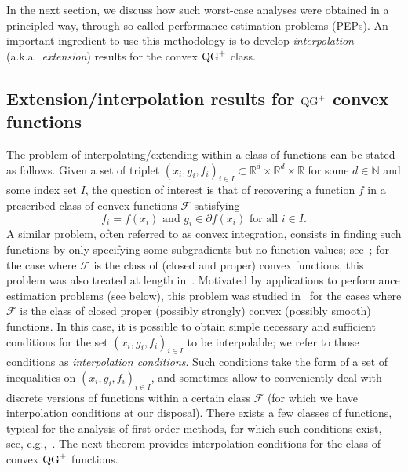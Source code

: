        In the next section, we discuss how such worst-case analyses were obtained in a principled way, through so-called performance estimation problems (PEPs).
        An important ingredient to use this methodology is to develop \emph{interpolation} (a.k.a.~\emph{extension}) results for the  convex $\operatorname{QG}^+$ class.

    \subsection{\texorpdfstring{Extension/interpolation results for $\operatorname{QG}^+$ convex functions}{Extension-interpolation results for QG+ convex functions}}
    \label{subsec:Interpol}

        The problem of interpolating/extending within a class of functions can be stated as follows.
        Given a set of triplet $(x_i, g_i, f_i)_{i \in I}\subset \mathbb{R}^d\times\mathbb{R}^d\times \mathbb{R}$ for some $d\in\mathbb{N}$ and some index set $I$, the question of interest is that of recovering a function $f$ in a prescribed class of convex functions $\mathcal{F}$ satisfying
        \[ f_i=f(x_i) \text{ and } g_i\in\partial f(x_i) \text{ for all } i\in I.\]
        A similar problem, often referred to as convex integration, consists in finding such functions by only specifying some subgradients but no function values; see~\citep{Rock70}; for the case where $\mathcal{F}$ is the class of (closed and proper) convex functions, this problem was also treated at length in~\citep{lambert2004finite}.
        Motivated by applications to performance estimation problems (see below), this problem was studied in~\citep{taylor2017smooth} for the cases where $\mathcal{F}$ is the class of closed proper (possibly strongly) convex (possibly smooth) functions.
        In this case, it is possible to obtain simple necessary and sufficient conditions for the set $(x_i, g_i, f_i)_{i \in I}$ to be interpolable; we refer to those conditions as \emph{interpolation conditions}.
        Such conditions take the form of a set of inequalities on $(x_i, g_i, f_i)_{i \in I}$, and sometimes allow to conveniently deal with discrete versions of functions within a certain class $\mathcal{F}$ (for which we have interpolation conditions at our disposal).
        There exists a few classes of functions, typical for the analysis of first-order methods, for which such conditions exist, see, e.g.,~\citep[Theorem 3.3--3.6, Theorem 3.10]{taylor2017exact}.
        The next theorem provides interpolation conditions for the class of convex $\operatorname{QG}^+$ functions.

